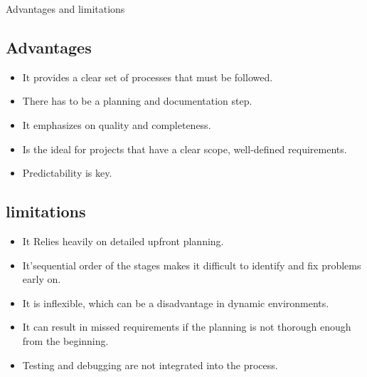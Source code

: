 \begin{section}{Advantages and limitations}
    \subsection{Advantages}
    
    \begin{itemize}
        \item It provides a clear set of processes that must be followed.
        
        \item There has to be a planning and documentation step.
        
        \item It emphasizes on quality and completeness.
        
        \item Is the ideal for projects that have a clear scope, well-defined requirements.
        
        \item Predictability is key.
    
    \end{itemize}
    \subsection{limitations}
    
    \begin{itemize}
        \item It Relies heavily on detailed upfront planning.
               
        \item It'sequential order of the stages makes it difficult to identify and fix problems early on.
        
        \item It is inflexible, which can be a disadvantage in dynamic environments.
        \
        \item It can result in missed requirements if the planning is not thorough enough from the beginning.
        
        \item Testing and debugging are not integrated into the process.
   
    \end{itemize}
    
    
    \end{section}